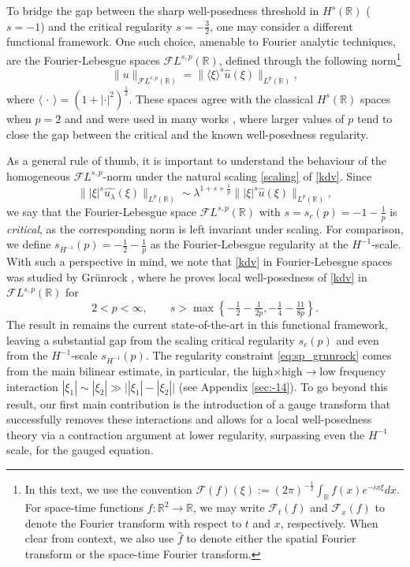 \documentclass[a4paper,
11pt,  reqno]{amsart}
\newcommand{\5}{\textup{V}}
\newcommand{\FL}{\mathcal{F} L}
\newcommand{\ft}{\widehat}
\theoremstyle{remark}
\newcommand{\R}{\mathbb{R}}
\newcommand{\ld}{\lambda}
\newcommand{\Ft}{{\mathcal{F}}}
\newcommand{\jb}[1]
{\langle #1 \rangle}
\numberwithin{equation}{section}
\numberwithin{theorem}{section}
\begin{document}
To bridge the gap between the sharp well-posedness threshold in $H^s(\R)$ ($s=-1$) and the critical regularity $s=-\frac32$, one may consider a different functional framework. 
One such choice, amenable to Fourier analytic techniques, are the Fourier-Lebesgue spaces $\FL^{s,p}(\R)$, defined through the following norm\footnote{
In this text, we use the convention
$
 \Ft(f)(\xi) := (2\pi)^{-\frac12} \int_\R f(x) e^{-i x \xi} dx. 
$
For space-time functions $f: \R^2 \to \R$, we may write $\Ft_t (f)$ and $\Ft_x(f)$ to denote the Fourier transform with respect to $t$ and $x$, respectively. When clear from context, we also use $\ft{f}$ to denote either the spatial Fourier transform or the space-time Fourier transform. }
	\begin{equation}
		\|u \|_{\FL^{s,p}(\R)}=\|\jb{\xi}^{s}\ft{u  }(\xi)\|_{L^p(\R)},
	\end{equation} 
    where $\jb{\,\cdot\,} = (1+|\cdot|^2)^\frac12$. 
These spaces agree with the classical $H^s(\R)$ spaces when $p=2$ and
and were used in many works \cite{adams, BO94, Chapouto_FL_mkdv, Christ_power,CC24,Grunrock_mkdv, Grunrock_ldv_hier, HerrGrunrock_FL,  GrunrockVega}, where larger values of $p$ tend to close the gap between the critical and the known well-posedness regularity. 





As a general rule of thumb, it is important to understand the behaviour of the homogeneous ${\FL}^{s,p}$-norm under the natural scaling \eqref{scaling} of \eqref{kdv}. 
Since 
$$
\big\| |\xi|^s  \ft{u_\ld}(\xi) \big\|_{L^p(\R)} \sim \lambda^{1+s+\frac1p}
\big\| |\xi|^s \ft{u} (\xi) \big\|_{L^p(\R)}, 
$$ 
we say that the Fourier-Lebesgue space $\FL^{s,p}(\R)$ with 
$s=s_c(p)=-1-\frac1p$ is \emph{critical}, as the corresponding norm is left invariant under scaling. For comparison, we define $s_{H^{-1}}(p) = - \frac12 - \frac1p$ as the Fourier-Lebesgue regularity at the $H^{-1}$-scale.
 With such a perspective in mind, we note that \eqref{kdv} in Fourier-Lebesgue spaces was studied by Gr\"unrock \cite{Grunrock_ldv_hier},  where he proves local well-posedness of \eqref{kdv} in $\mathcal{F}L^{s,p}(\R)$ for
	\begin{equation}
		2<p<\infty,\qquad s>\max\left\{ -\tfrac12 - \tfrac{1}{2p}, -\tfrac14 - \tfrac{11}{8p} \right\}.
\label{eq:sp_grunrock}
	\end{equation}
The result in \cite{Grunrock_ldv_hier} remains the current state-of-the-art in this functional framework, leaving a substantial gap from the scaling critical regularity $s_c(p)$ and even from the $H^{-1}$-scale $s_{H^{-1}}(p)$. The regularity constraint \eqref{eq:sp_grunrock} comes from the main bilinear estimate, in particular, the high$\times$high$\to$low frequency interaction $|\xi_1| \sim |\xi_2| \gg \big||\xi_1| - |\xi_2|\big|$ (see Appendix \ref{sec:-14}). 
To go beyond this result, our first main contribution is the introduction of a gauge transform that 
successfully removes these interactions and allows for a local well-posedness theory via a contraction argument at lower regularity, surpassing even the $H^{-1}$ scale, for the gauged equation.
\end{document}
